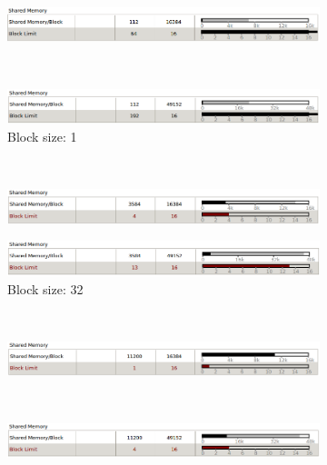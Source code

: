 \begin{figure}
	\centering
	\begin{subfigure}{0.6\linewidth}
		\centering
		\includegraphics[width = \linewidth]{Figures/sparse_shared_1}
	\end{subfigure}\\
	\begin{subfigure}{0.6\linewidth}
		\centering
		\includegraphics[width=\linewidth]{Figures/sparse_shared_M_1}
		\caption{Block size: 1}
	\end{subfigure}\\
	\begin{subfigure}{0.6\linewidth}
		\centering
		\includegraphics[width=\linewidth]{Figures/sparse_shared_32}
	\end{subfigure}
	\begin{subfigure}{0.6\linewidth}
		\centering
		\includegraphics[width=\linewidth]{Figures/sparse_shared_M_32}
		\caption{Block size: 32}
	\end{subfigure}\\
	\begin{subfigure}{0.6\linewidth}
		\centering
		\includegraphics[width=\linewidth]{Figures/sparse_shared_100}
	\end{subfigure}\\
	\begin{subfigure}{0.6\linewidth}
		\centering
		\includegraphics[width=\linewidth]{Figures/sparse_shared_M_100}

\end{subfigure}
\end{figure}
